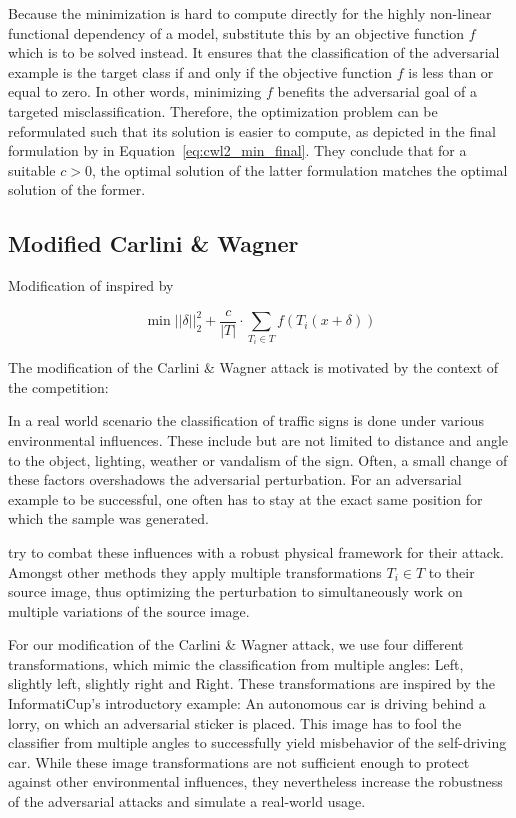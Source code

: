 Because the minimization is hard to compute directly for the highly non-linear functional dependency of a model, \citeauthor{carlini2017towards} substitute this by an objective function $f$ which is to be solved instead.
It ensures that the classification of the adversarial example is the target class if and only if the objective function $f$ is less than or equal to zero.
In other words, minimizing $f$ benefits the adversarial goal of a targeted misclassification.
Therefore, the optimization problem can be reformulated such that its solution is easier to compute, as depicted in the final formulation by \citeauthor{carlini2017towards} in Equation~\ref{eq:cwl2_min_final}.
They conclude that for a suitable $c > 0$, the optimal solution of the latter formulation matches the optimal solution of the former.

\subsection{Modified Carlini \& Wagner}\label{subsec:cwl2_mod}

Modification of \cite{carlini2017towards} inspired by \cite{eykholt2018robust}

\begin{equation}
\min ||\delta||^2_2 + \frac{c}{|T|} \cdot \sum_{T_i \in T} f(T_i(x + \delta))
\end{equation}

The modification of the Carlini \& Wagner attack is motivated by the context of the competition:

In a real world scenario the classification of traffic signs is done under various environmental influences.
These include but are not limited to distance and angle to the object, lighting, weather or vandalism of the sign.
Often, a small change of these factors overshadows the adversarial perturbation. %
For an adversarial example to be successful, one often has to stay at the exact same position for which the sample was generated. 

\citet{eykholt2018robust} try to combat these influences with a robust physical framework for their attack.
Amongst other methods they apply multiple transformations $T_i \in T$ to their source image,
thus optimizing the perturbation to simultaneously work on multiple variations of the source image.

For our modification of the Carlini \& Wagner attack, we use four different transformations,
which mimic the classification from multiple angles: Left, slightly left, slightly right and Right.
These transformations are inspired by the InformatiCup's introductory example:
An autonomous car is driving behind a lorry, on which an adversarial sticker is placed.
This image has to fool the classifier from multiple angles to successfully yield misbehavior of the self-driving car.
While these image transformations are not sufficient enough to protect against other environmental influences, they nevertheless increase the robustness of the adversarial attacks and simulate a real-world usage.

